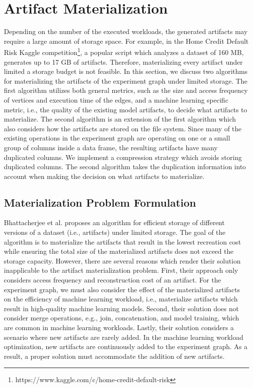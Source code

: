 \section{Artifact Materialization}\label{sec-materialization}
Depending on the number of the executed workloads, the generated artifacts may require a large amount of storage space.
For example, in the Home Credit Default Risk Kaggle competition\footnote{https://www.kaggle.com/c/home-credit-default-risk}, a popular script which analyzes a dataset of 160 MB, generates up to 17 GB of artifacts.
Therefore, materializing every artifact under limited a storage budget is not feasible.
In this section, we discuss two algorithms for materializing the artifacts of the experiment graph under limited storage.
The first algorithm utilizes both general metrics, such as the size and access frequency of vertices and execution time of the edges, and a machine learning specific metric, i.e., the quality of the existing model artifacts, to decide what artifacts to materialize.
The second algorithm is an extension of the first algorithm which also considers how the artifacts are stored on the file system.
Since many of the existing operations in the experiment graph are operating on one or a small group of columns inside a data frame, the resulting artifacts have many duplicated columns.
We implement a compression strategy which avoids storing duplicated columns.
The second algorithm takes the duplication information into account when making the decision on what artifacts to materialize.

\subsection{Materialization Problem Formulation}\label{subsec-materialization-problem}
Bhattacherjee et al. \cite{bhattacherjee2015principles} proposes an algorithm for efficient storage of different versions of a dataset (i.e., artifacts) under limited storage.
The goal of the algorithm is to materialize the artifacts that result in the lowest recreation cost while ensuring the total size of the materialized artifacts does not exceed the storage capacity.
However, there are several reasons which render their solution inapplicable to the artifact materialization problem.
First, their approach only considers access frequency and reconstruction cost of an artifact.
For the experiment graph, we must also consider the effect of the materialized artifacts on the efficiency of machine learning workload, i.e., materialize artifacts which result in high-quality machine learning models.
Second, their solution does not consider merge operations, e.g., join, concatenation, and model training, which are common in machine learning workloads.
Lastly, their solution considers a scenario where new artifacts are rarely added.
In the machine learning workload optimization, new artifacts are continuously added to the experiment graph.
As a result, a proper solution must accommodate the addition of new artifacts.

